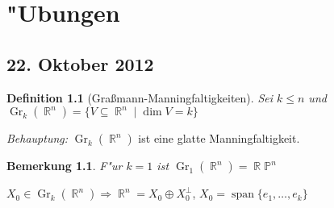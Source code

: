 \documentclass[paper=A4, twoside, chapterprefix=true, bibliography=totoc, headsepline]{scrbook}
\renewcommand{\thesection}{\arabic{section}}
\renewcommand*{\sectionmarkformat}{\thesection\autodot\enskip}
\DeclareMathOperator{\R}{\mathbb{R}}
\renewcommand{\P}{\ensuremath{\mathbb{P}}}
\DeclareMathOperator{\mspan}{span} %
\DeclareMathOperator{\Gr}{Gr}
\theoremstyle{plain}
\theoremstyle{nonumberplain}
\newtheorem{dfn}{Definition}
\newtheorem{bem}{Bemerkung}
\theoremstyle{empty}
\theoremstyle{break}
\begin{document}



\appendix


\renewcommand*{\othersectionlevelsformat}[3]{\ifstr{#1}{section}{\"Ubung\ #3\ vom\ }{#3\autodot\enskip}}

\renewcommand*{\sectionmarkformat}{\"Ubung \thesection\autodot\ vom\enskip}


\chapter{"Ubungen}
\setcounter{section}{-1}

\section{22. Oktober 2012}
\setcounter{Aufg}{0} %
\setcounter{Loes}{0}

\begin{dfn}[Gra\ss mann-Manningfaltigkeiten]
Sei $k \le n$ und $\Gr_k(\R^n) = \{ V \subseteq \R^n \mid \dim V = k\}$
\end{dfn}

\emph{Behauptung:} $\Gr_k(\R^n)$ ist eine glatte Manningfaltigkeit.

\begin{bem}
F"ur $k = 1$ ist $\Gr_1(\R^n) = \R \P^n$
\end{bem}

$X_0 \in \Gr_k(\R^n) \Rightarrow \R^n = X_0 \oplus X_0^\perp$, $X_0 = \mspan\{e_1,\ldots ,e_k\}$ 
\end{document}
